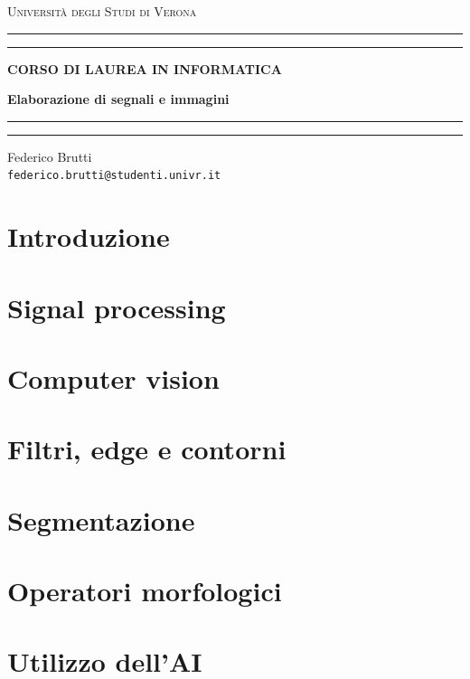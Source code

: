 \documentclass[12pt, a4paper, oneside]{book}
\begin{document}
	
	\begin{titlepage}
		\begin{center}
			{{\LARGE{\textsc{Università degli Studi di Verona}}}} \rule[0.1cm]{15.8cm}{0.1mm}
			\rule[0.5cm]{15.8cm}{0.6mm}
			{\small{\bf CORSO DI LAUREA IN INFORMATICA}}
		\end{center}
		\vspace{12.5mm}
		
		\begin{center}
			{\Huge{\bf Elaborazione di segnali e immagini}}
		\end{center}
		\vspace{130mm}
		
		\begin{minipage}[l]{1.8mm}
			\rule[0.1cm]{0.1mm}{2cm}
			\rule[0.1cm]{0.6mm}{2cm}
		\end{minipage}
		\hspace{2mm}
		\begin{minipage}{10cm}	
			{\large{Federico Brutti\\
			\texttt{federico.brutti@studenti.univr.it}}}
		\end{minipage}
	\end{titlepage}
	
	\blankpage
	\tableofcontents
	
	\chapter{Introduzione}
	
	\chapter{Signal processing}
	
	\chapter{Computer vision}
	
	\chapter{Filtri, edge e contorni}
	
	\chapter{Segmentazione}
	
	\chapter{Operatori morfologici}
	
	\chapter{Utilizzo dell'AI}
	
\end{document}
